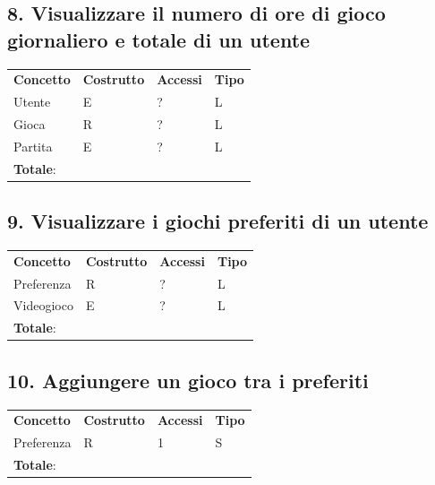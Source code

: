 \documentclass[a4paper,12pt]{report}
\begin{document}
\newpage

\subsection*{8. Visualizzare il numero di ore di gioco giornaliero e totale di un utente}

\begin{table}[h!]
\begin{center}
	\begin{tabular}{ | m{4cm} P{4cm} P{4cm} P{4cm} | }
	 \textbf{Concetto} & \textbf{Costrutto} & \textbf{Accessi} & \textbf{Tipo} \\
	Utente  & E & ? & L \\ \hline
	Gioca   & R & ? & L \\ \hline
	Partita & E & ? & L \\ \hline
	 \textbf{Totale}: & & & \\ \hline
	\end{tabular}
\end{center}
\end{table}

\subsection*{9. Visualizzare i giochi preferiti di un utente}

\begin{table}[h!]
\begin{center}
	\begin{tabular}{ | m{4cm} P{4cm} P{4cm} P{4cm} | }
	 \textbf{Concetto} & \textbf{Costrutto} & \textbf{Accessi} & \textbf{Tipo} \\
	Preferenza & R & ? & L \\ \hline
	Videogioco & E & ? & L \\ \hline
	 \textbf{Totale}: & & & \\ \hline
	\end{tabular}
\end{center}
\end{table}

\subsection*{10. Aggiungere un gioco tra i preferiti}


\begin{table}[h!]
\begin{center}
	\begin{tabular}{ | m{4cm} P{4cm} P{4cm} P{4cm} | }
	 \textbf{Concetto} & \textbf{Costrutto} & \textbf{Accessi} & \textbf{Tipo} \\
	Preferenza & R & 1 & S \\ \hline
	 \textbf{Totale}: & & & \\ \hline
	\end{tabular}
\end{center}
\end{table}
\end{document}
